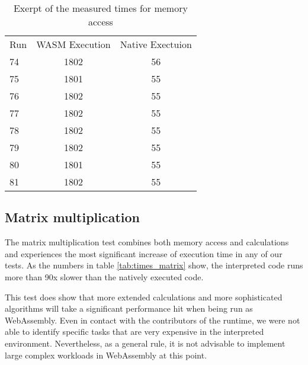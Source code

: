 \begin{table} [h]
    \begin{tabular}{l c c}
        Run & WASM Execution & Native Exectuion \\
        74  & 1802           & 56               \\
        75  & 1801           & 55               \\
        76  & 1802           & 55               \\
        77  & 1802           & 55               \\
        78  & 1802           & 55               \\
        79  & 1802           & 55               \\
        80  & 1801           & 55               \\
        81  & 1802           & 55               \\
    \end{tabular}
    \caption{Exerpt of the measured times for memory access}
    \label{tab:times_memory}
\end{table}

\subsection{Matrix multiplication}

The matrix multiplication test combines both memory access and calculations and experiences the most significant increase of execution time in any of our tests. As the numbers in table \ref{tab:times_matrix} show, the interpreted code runs more than 90x slower than the natively executed code.

This test does show that more extended calculations and more sophisticated algorithms will take a significant performance hit when being run as WebAssembly. Even in contact with the contributors of the runtime, we were not able to identify specific tasks that are very expensive in the interpreted environment. Nevertheless, as a general rule, it is not advisable to implement large complex workloads in WebAssembly at this point.

